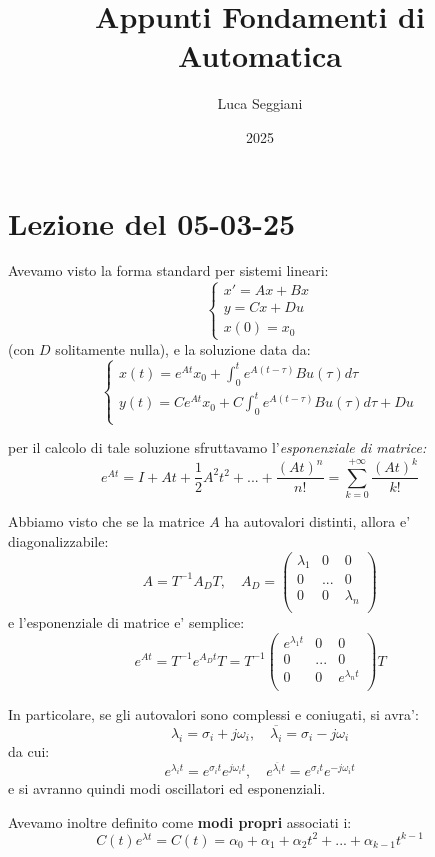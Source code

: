 \documentclass[a4paper,11pt]{article}
\title{Appunti Fondamenti di Automatica}
\author{Luca Seggiani}
\date{2025}
\begin{document}
\section{Lezione del 05-03-25}

\thispagestyle{empty}
\pagestyle{fancy}

Avevamo visto la forma standard per sistemi lineari:
\[
	\begin{cases}
		x' = Ax + Bx \\
		y = Cx + Du \\
		x(0) = x_0
	\end{cases}
\]
(con $D$ solitamente nulla), e la soluzione data da:
\[
	\begin{cases}
		x(t) = e^{At} x_0 + \int_0^t e^{A(t - \tau)} Bu(\tau) d\tau \\
		y(t) = Ce^{At} x_0 + C\int_0^t e^{A(t - \tau)} Bu(\tau) d\tau + Du \\
	\end{cases}
\]

per il calcolo di tale soluzione sfruttavamo l'\textit{esponenziale di matrice:}
$$
e^{At} = I + At + \frac{1}{2}A^2t^2+ ... + \frac{(At)^n}{n!} = \sum_{k = 0}^{+\infty} \frac{(At)^k}{k!} 
$$

Abbiamo visto che se la matrice $A$ ha autovalori distinti, allora e' diagonalizzabile:
$$
A = T^{-1} A_D T, \quad A_D = \begin{pmatrix}
	\lambda_1 & 0 & 0 \\
	0 & ... & 0 \\
	0 & 0 & \lambda_n \\
\end{pmatrix}
$$
e l'esponenziale di matrice e' semplice:
$$
e^{At} = T^{-1} e^{A_D t} T = T^{-1} \begin{pmatrix}
	e^{\lambda_1 t} & 0 & 0 \\
	0 & ... & 0 \\
	0 & 0 & e^{\lambda_n t} \\
\end{pmatrix} T
$$

In particolare, se gli autovalori sono complessi e coniugati, si avra':
$$
\lambda_i = \sigma_i + j \omega_i, \quad \overline{\lambda_i} = \sigma_i - j \omega_i 
$$
da cui:
$$
e^{\lambda_i t} = e^{\sigma_i t} e^{j\omega_i t}, \quad e^{\overline{\lambda_i} t} = e^{\sigma_i t} e^{-j\omega_i t}
$$
e si avranno quindi modi oscillatori ed esponenziali.

Avevamo inoltre definito come \textbf{modi propri} associati i:
$$
C(t) e^{\lambda t} = C(t) = \alpha_0 + \alpha_1 + \alpha_2 t^2 + ... + \alpha_{k - 1} t^{k -1}
$$
\end{document}
